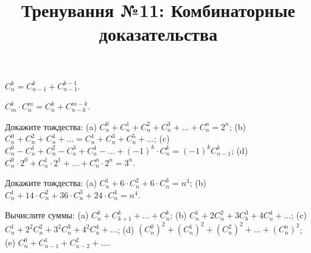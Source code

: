 


\title{Тренування №11: Комбинаторные доказательства}
\maketitle
\begin{problem}
	$C_n^k = C_{n-1}^k + C_{n-1}^{k-1}$.
\end{problem}

\begin{problem}
	$C_m^k \cdot C_n^m = C_n^k + C_{n-k}^{m-k}$.
\end{problem}

\begin{problem}
	Докажите тождества: (a) $C_n^0 + C_n^1 + C_n^2 + C_n^3 + \ldots + C_n^n = 2^n$; \medskip (b) $C_n^0 + C_n^2 + C_n^4 + \ldots = C_n^1 + C_n^3 + C_n^5 + \ldots$; \medskip (c) $C_n^0 - C_n^1 + C_n^2 - C_n^3 + C_n^4 - \ldots + (-1)^k \cdot C_n^k = (-1)^k C_{n-1}^k$; \medskip (d) $C_n^0 \cdot 2^0 + C_n^1 \cdot 2^1 + \ldots + C_n^n \cdot 2^n = 3^n$.
\end{problem}

\begin{problem}
	Докажите тождества: (a) $C_n^1 + 6 \cdot C_n^2 + 6 \cdot C_n^3 = n^3$; \medskip (b) $C_n^1 + 14 \cdot C_n^2 + 36 \cdot C_n^3 + 24 \cdot C_n^4 = n^4$.
\end{problem}

\begin{problem}
	Вычислите суммы: (a) $C_n^k + C_{k+1}^k + \ldots + C_n^k$; \medskip (b) $C_n^1 + 2 C_n^2 + 3 C_b^3 + 4 C_n^4 + \ldots$; \medskip (c) $C_n^1 + 2^2 C_n^2 + 3^2 C_n^3 + 4^2 C_n^4 + \ldots$; \medskip (d) $(C_n^0)^2 + (C_n^1)^2 + (C_n^2)^2 + \ldots + (C_n^n)^2$; \medskip (e) $C_n^0 + C_{n-1}^1 + C_{n-2}^2 + \ldots$.
\end{problem}

